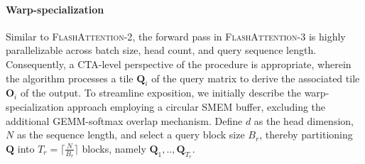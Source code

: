 \paragraph{Warp-specialization}
Similar to \textsc{FlashAttention-2}, the forward pass in \textsc{FlashAttention-3} is highly parallelizable across batch size, head count, and query sequence length. Consequently, a CTA-level perspective of the procedure is appropriate, wherein the algorithm processes a tile $\mathbf{Q}_i$ of the query matrix to derive the associated tile $\mathbf{O}_i$ of the output. To streamline exposition, we initially describe the warp-specialization approach employing a circular SMEM buffer, excluding the additional GEMM-softmax overlap mechanism. Define $d$ as the head dimension, $N$ as the sequence length, and select a query block size $B_r$, thereby partitioning $\mathbf{Q}$ into $T_r = \lceil \frac{N}{B_r} \rceil$ blocks, namely $\mathbf{Q}_1, .., \mathbf{Q}_{T_r}$.

